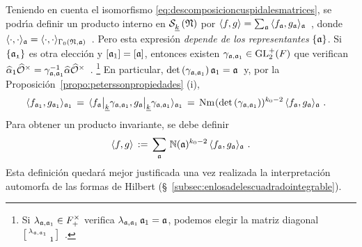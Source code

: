 \begin{obsMockProductoInterno}\label{obs:mockproductointerno}
	Teniendo en cuenta el isomorfismo
	\eqref{eq:descomposicioncuspidalesmatrices}, se podr\'{\i}a definir un
	producto interno en $\spitzH{k}{\frak{N}}$ por
	\begin{math}
		\langle f,g\rangle =\sum_{\frak{a}}\,
		\langle f_{\frak{a}},g_{\frak{a}}\rangle_{\frak{a}}
	\end{math}~,
	donde
	\begin{math}
		\langle\cdot,\cdot\rangle_{\frak{a}}=
		\langle\cdot,\cdot\rangle_{\Gamma_{0}(\frak{N},\frak{a})}
	\end{math}~.
	Pero esta expresi\'{o}n \emph{depende de los representantes}
	$\{\frak{a}\}$. Si $\{\frak{a_{1}}\}$ es otra elecci\'{o}n y
	$[\frak{a}_{1}]=[\frak{a}]$, entonces existen
	$\gamma_{\frak{a},\frak{a}_{1}}\in\GLtp_{2}(F)$ que verifican
	\begin{math}
		\hhat{\alpha}_{1}\Idfin{\cal{O}}=
		\gamma_{\frak{a},\frak{a}_{1}}^{-1}\hhat{\alpha}\Idfin{\cal{O}}
	\end{math}~.%
	\footnote{
		Si $\lambda_{\frak{a},\frak{a}_{1}}\in F_{+}^{\times}$ verifica
		$\lambda_{\frak{a},\frak{a}_{1}}\,\frak{a}_{1}=\frak{a}$,
		podemos elegir la matriz diagonal
		\begin{math}
			\left[\begin{smallmatrix}
				\lambda_{\frak{a},\frak{a}_{1}} & \\
				& 1
			\end{smallmatrix}\right]
		\end{math}~.
	}
	En particular,
	\begin{math}
		\det(\gamma_{\frak{a},\frak{a}_{1}})\,\frak{a}_{1}=\frak{a}
	\end{math}~y, por la Proposici\'{o}n~\ref{propo:peterssonpropiedades}
	(i),
	\begin{align*}
		\langle f_{\frak{a}_{1}},g_{\frak{a}_{1}}
			\rangle_{\frak{a}_{1}} & \,=\,
		\langle f_{\frak{a}}\operadormatrices{\peso{k}}{%
				\gamma_{\frak{a},\frak{a}_{1}}},
		g_{\frak{a}}\operadormatrices{\peso{k}}{%
			\gamma_{\frak{a},\frak{a}_{1}}}\rangle_{\frak{a}_{1}}
		\,=\,\norma(
			\det(\gamma_{\frak{a},\frak{a}_{1}}))^{k_{0}-2}\,
		\langle f_{\frak{a}},g_{\frak{a}}\rangle_{\frak{a}}
		\text{ .}
	\end{align*}
	Para obtener un producto invariante, se debe definir
	\begin{equation}
		\label{eq:productointernodepeterssondehilbert}
		\langle f,g\rangle \,:=\,\sum_{\frak{a}}\,
			\idnorm(\frak{a})^{k_{0}-2}\,\langle f_{\frak{a}},
				g_{\frak{a}}\rangle_{\frak{a}}
		\text{ .}
	\end{equation}
	Esta definici\'{o}n quedar\'{a} mejor justificada una vez realizada la
	interpretaci\'{o}n automorfa de las formas de Hilbert
	(\S~\ref{subsec:enlosadelescuadradointegrable}).
\end{obsMockProductoInterno}


